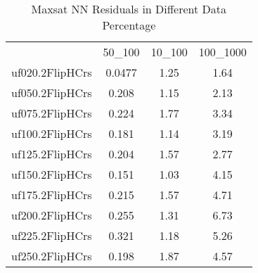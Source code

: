 \begin{table}[htbp]
\caption{Maxsat NN Residuals in Different Data Percentage}
\centering
\begin{tabular}{|cccc|}
\hline
 & 50_100 & 10_100 & 100_1000 \\
uf020.2FlipHCrs & 0.0477 & 1.25 & 1.64 \\
uf050.2FlipHCrs & 0.208 & 1.15 & 2.13 \\
uf075.2FlipHCrs & 0.224 & 1.77 & 3.34 \\
uf100.2FlipHCrs & 0.181 & 1.14 & 3.19 \\
uf125.2FlipHCrs & 0.204 & 1.57 & 2.77 \\
uf150.2FlipHCrs & 0.151 & 1.03 & 4.15 \\
uf175.2FlipHCrs & 0.215 & 1.57 & 4.71 \\
uf200.2FlipHCrs & 0.255 & 1.31 & 6.73 \\
uf225.2FlipHCrs & 0.321 & 1.18 & 5.26 \\
uf250.2FlipHCrs & 0.198 & 1.87 & 4.57 \\
\hline
\end{tabular}
\end{table}
